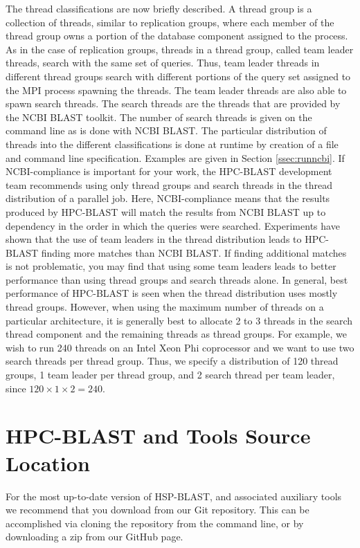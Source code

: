 \documentclass[10pt]{article}
\begin{document}
The thread classifications are now briefly described.  A thread group is a collection of threads, similar to replication groups, where each member of the thread group owns a portion of the database component assigned to the process.
As in the case of replication groups, threads in a thread group, called team leader threads, search with the same set of queries.  Thus, team leader threads in different thread groups search with different portions of the query set assigned to the MPI process spawning the threads.
The team leader threads are also able to spawn search threads.  The search threads are the threads that are provided by the NCBI BLAST toolkit.  The number of search threads is given on the command line as is done with NCBI BLAST.  The particular distribution of threads into the
different classifications is done at runtime by creation of a file and command line specification.  Examples are given in Section \ref{ssec:runncbi}.  If NCBI-compliance is important for your work, the HPC-BLAST development team recommends using only thread groups and search threads
in the thread distribution of a parallel job.  Here, NCBI-compliance means that the results produced by HPC-BLAST will match the results from NCBI BLAST up to dependency in the order in which the queries were searched.  Experiments have shown that the use of team leaders in the
thread distribution leads to HPC-BLAST finding more matches than NCBI BLAST.  If finding additional matches is not problematic, you may find that using some team leaders leads to better performance than using thread groups and search threads alone.
In general, best performance of HPC-BLAST is seen when the thread distribution uses mostly thread groups.  However, when using the maximum number
of threads on a particular architecture, it is generally best to allocate 2 to 3 threads in the search thread component and the remaining threads as thread groups.  For example, we wish to run 240 threads on an Intel Xeon Phi coprocessor and we want to use two search threads per thread
group.  Thus, we specify a distribution of 120 thread groups, 1 team leader per thread group, and 2 search thread per team leader, since \(120 \times 1 \times 2 = 240\).

\clearpage

\section{HPC-BLAST and Tools Source Location} \label{sec:src}

For the most up-to-date version of HSP-BLAST, 
and associated auxiliary tools we recommend that you
download from our Git repository. This can be accomplished via
cloning the repository from the command line, or by downloading a zip
from our GitHub page.   
\end{document}
